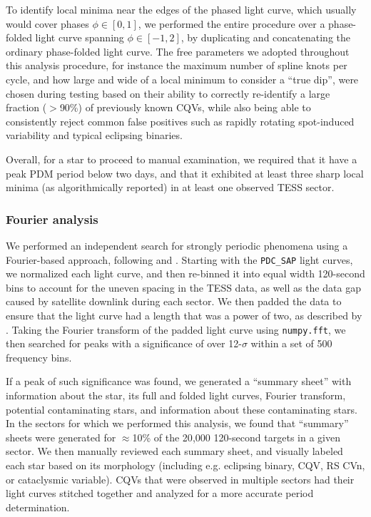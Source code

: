\documentclass[11pt,twocolumn,tighten]{aastex63}
\begin{document}
To identify local minima near the edges of the phased light curve,
which usually would cover phases $\phi \in [ 0,1 ]$, we performed the
entire procedure over a phase-folded light curve spanning $\phi \in
[-1,2 ]$, by duplicating and concatenating the ordinary phase-folded
light curve.  The free parameters we adopted throughout this analysis
procedure, for instance the maximum number of spline knots per cycle,
and how large and wide of a local minimum to consider a ``true dip'',
were chosen during testing based on their ability to correctly
re-identify a large fraction ($>$90\%) of previously known CQVs, while also being
able to consistently reject common false positives such as rapidly
rotating spot-induced variability and typical eclipsing binaries.

Overall, for a star to proceed to manual examination, we required that
it have a peak PDM period below two days, and that it exhibited at
least three sharp local minima (as algorithmically reported) in at
least one observed TESS sector.



\subsubsection{Fourier analysis}
\label{subsec:fourier}

We performed an independent search for strongly periodic phenomena
using a Fourier-based approach, following \citet{2019ApJ...876..127Z}
and \citet[][their Section~1.3]{2023MNRAS.524.4220P}.  Starting with
the {\tt PDC\_SAP} light curves, we normalized each light curve, and
then re-binned it into equal width 120-second bins to account for the
uneven spacing in the TESS data, as well as the data gap caused by
satellite downlink during each sector.  We then padded the data to
ensure that the light curve had a length that was a power of two, as
described by \citeauthor{2019ApJ...876..127Z}.  Taking the Fourier
transform of the padded light curve using {\tt numpy.fft},
we then searched for peaks with a significance of over 12-$\sigma$
within a set of 500 frequency bins. 

If a peak of such significance was found, we generated a ``summary
sheet'' with information about the star, its full and folded light
curves, Fourier transform, potential contaminating stars, and
information about these contaminating stars.  In the sectors for which
we performed this analysis, we found that ``summary'' sheets were
generated for $\approx$10\% of the 20{,}000 120-second targets in a
given sector.  We then manually reviewed each summary sheet, and
visually labeled each star based on its morphology (including e.g.
eclipsing binary, CQV, RS CVn, or cataclysmic variable).  CQVs that
were observed in multiple sectors had their light curves stitched
together and analyzed for a more accurate period determination.
\end{document}
